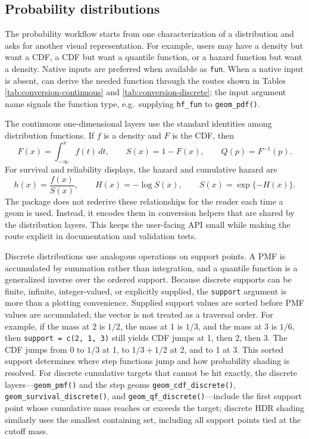 \subsection{Probability distributions}\label{probability-distributions}

The probability workflow starts from one characterization of a distribution and
asks for another visual representation. For example, users may have a density
but want a CDF, a CDF but want a quantile function, or a hazard function but
want a density. Native inputs are preferred when available as \texttt{fun}. When a
native input is absent,  can derive the needed function through
the routes shown in Tables \ref{tab:conversion-continuous} and
\ref{tab:conversion-discrete}; the input argument name signals the function
type, e.g.~supplying \texttt{hf\_fun} to \texttt{geom\_pdf()}.

The continuous one-dimensional layers use the standard identities among
distribution functions. If \(f\) is a density and \(F\) is the CDF, then
\[
  F(x) = \int_{-\infty}^{x} f(t)\,dt,\qquad
  S(x) = 1-F(x),\qquad
  Q(p) = F^{-1}(p).
\]
For survival and reliability displays, the hazard and cumulative hazard are
\[
  h(x) = \frac{f(x)}{S(x)},\qquad
  H(x) = -\log S(x),\qquad
  S(x) = \exp\{-H(x)\}.
\]
The package does not rederive these relationships for the reader each time a
geom is used. Instead, it encodes them in conversion helpers that are shared by
the distribution layers. This keeps the user-facing API small while making the
route explicit in documentation and validation tests.

Discrete distributions use analogous operations on support points. A PMF is
accumulated by summation rather than integration, and a quantile function is a
generalized inverse over the ordered support. Because discrete supports can be
finite, infinite, integer-valued, or explicitly supplied, the \texttt{support} argument
is more than a plotting convenience. Supplied support values are sorted before
PMF values are accumulated; the vector is not treated as a traversal order. For
example, if the mass at 2 is \(1/2\), the mass at 1 is \(1/3\), and the mass at
3 is \(1/6\), then \texttt{support\ =\ c(2,\ 1,\ 3)} still yields CDF jumps at 1, then 2,
then 3. The CDF jumps from 0 to \(1/3\) at 1, to \(1/3+1/2\) at 2, and to 1 at
3. This sorted support determines where step functions jump and how probability
shading is resolved. For discrete cumulative targets that cannot be hit exactly,
the discrete layers---\texttt{geom\_pmf()} and the step geoms \texttt{geom\_cdf\_discrete()},
\texttt{geom\_survival\_discrete()}, and \texttt{geom\_qf\_discrete()}---include the first
support point whose cumulative mass reaches or exceeds the target; discrete
HDR shading similarly uses the smallest containing set, including all support
points tied at the cutoff mass.

